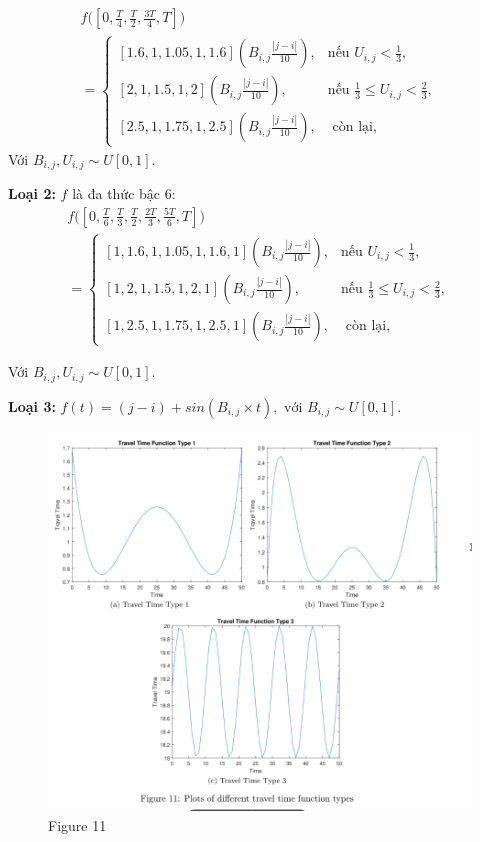 \documentclass[../main.tex]{subfiles}
\begin{document}
\begin{multline}
   f\big([0, \frac{T}{4}, \frac{T}{2}, \frac{3T}{4}, T]\big) \\
   =
   \begin{cases} 
    [1.6, 1, 1.05, 1, 1.6](B_{i,j} \frac{|j − i|}{10}), & \text {nếu } U_{i,j} < \frac{1}{3}, \\ 
    [2, 1, 1.5, 1, 2](B_{i,j} \frac{|j − i|}{10}), & \text {nếu } \frac{1}{3} \leq U_{i,j} < \frac{2}{3}, \\ 
    [2.5, 1, 1.75, 1, 2.5](B_{i,j} \frac{|j − i|}{10}), & \text{ còn lại},
    \end{cases}
    \end{multline}
    Với \(B_{i, j}, U_{i, j} \sim U[0, 1]\).

\textbf{Loại 2:} \(f\) là đa thức bậc 6:
\begin{multline}
    f\big([0, \frac{T}{6}, \frac{T}{3}, \frac{T}{2}, \frac{2T}{3}, \frac{5T}{6}, T]\big) \\
    = 
    \begin{cases} 
    [1, 1.6, 1, 1.05, 1, 1.6, 1](B_{i,j} \frac{|j − i|}{10}), & \text {nếu }  U_{i,j} < \frac{1}{3}, \\ 
    [1, 2, 1, 1.5, 1, 2, 1](B_{i,j} \frac{|j − i|}{10}), & \text {nếu } \frac{1}{3} \leq U_{i,j} < \frac{2}{3}, \\ 
    [1, 2.5, 1, 1.75, 1, 2.5, 1](B_{i,j} \frac{|j − i|}{10}), & \text{ còn lại},
    \end{cases}
\end{multline}

Với \(B_{i, j}, U_{i, j} \sim U[0, 1]\).

\textbf{Loại 3:} 
\(f(t) = (j − i) + sin (B_{i,j} \times t), \text{ với } B_{i,j} \sim U[0, 1].\)

\begin{figure}
\centering
\includegraphics{images/Figure11.png}
\caption{Figure 11}
\label{fig:11}
\end{figure}
\end{document}
